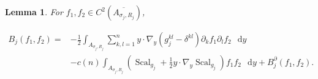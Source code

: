 \documentclass[11pt]{article}
\numberwithin{equation}{section}
\newtheorem{lemma}[theorem]{Lemma}
\theoremstyle{remark}
\newcommand{\dd}{\mathop{}\!\mathrm{d}}
\begin{document}
\par
\begin{lemma}\label{lem:weak-dilation-identity}
For \(f_1,f_2\in C^2(\overline{A_{\sigma_j,R_j}})\),
 
\begin{equation}\label{eq:weak-dilation-identity}
 \begin{aligned}
  B_j(f_1,f_2)
 ={}&-\frac12\int_{A_{\sigma_j,R_j}}\sum_{k,l=1}^n
 y\cdot\nabla_y(g_j^{kl}-\delta^{kl})
 \partial_kf_1\partial_lf_2\,\dd y\\
 &-c(n)\int_{A_{\sigma_j,R_j}}
 \left(\operatorname{Scal}_{g_j}+\frac12y\cdot\nabla_y\operatorname{Scal}_{g_j}\right)f_1f_2\,\dd y
 + B_j^\partial(f_1,f_2).
 \end{aligned}
\end{equation}

\end{lemma}
\end{document}
